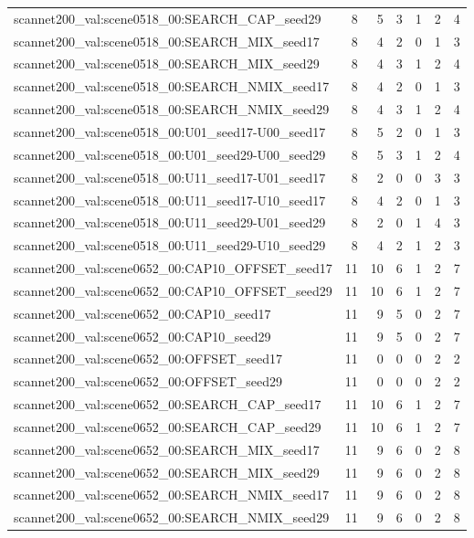 \begin{table}[t]
\begin{tabular}{lrrrrrr}
scannet200\_val:scene0518\_00:SEARCH\_CAP\_seed29 & 8 & 5 & 3 & 1 & 2 & 4 \\
scannet200\_val:scene0518\_00:SEARCH\_MIX\_seed17 & 8 & 4 & 2 & 0 & 1 & 3 \\
scannet200\_val:scene0518\_00:SEARCH\_MIX\_seed29 & 8 & 4 & 3 & 1 & 2 & 4 \\
scannet200\_val:scene0518\_00:SEARCH\_NMIX\_seed17 & 8 & 4 & 2 & 0 & 1 & 3 \\
scannet200\_val:scene0518\_00:SEARCH\_NMIX\_seed29 & 8 & 4 & 3 & 1 & 2 & 4 \\
scannet200\_val:scene0518\_00:U01\_seed17-U00\_seed17 & 8 & 5 & 2 & 0 & 1 & 3 \\
scannet200\_val:scene0518\_00:U01\_seed29-U00\_seed29 & 8 & 5 & 3 & 1 & 2 & 4 \\
scannet200\_val:scene0518\_00:U11\_seed17-U01\_seed17 & 8 & 2 & 0 & 0 & 3 & 3 \\
scannet200\_val:scene0518\_00:U11\_seed17-U10\_seed17 & 8 & 4 & 2 & 0 & 1 & 3 \\
scannet200\_val:scene0518\_00:U11\_seed29-U01\_seed29 & 8 & 2 & 0 & 1 & 4 & 3 \\
scannet200\_val:scene0518\_00:U11\_seed29-U10\_seed29 & 8 & 4 & 2 & 1 & 2 & 3 \\
scannet200\_val:scene0652\_00:CAP10\_OFFSET\_seed17 & 11 & 10 & 6 & 1 & 2 & 7 \\
scannet200\_val:scene0652\_00:CAP10\_OFFSET\_seed29 & 11 & 10 & 6 & 1 & 2 & 7 \\
scannet200\_val:scene0652\_00:CAP10\_seed17 & 11 & 9 & 5 & 0 & 2 & 7 \\
scannet200\_val:scene0652\_00:CAP10\_seed29 & 11 & 9 & 5 & 0 & 2 & 7 \\
scannet200\_val:scene0652\_00:OFFSET\_seed17 & 11 & 0 & 0 & 0 & 2 & 2 \\
scannet200\_val:scene0652\_00:OFFSET\_seed29 & 11 & 0 & 0 & 0 & 2 & 2 \\
scannet200\_val:scene0652\_00:SEARCH\_CAP\_seed17 & 11 & 10 & 6 & 1 & 2 & 7 \\
scannet200\_val:scene0652\_00:SEARCH\_CAP\_seed29 & 11 & 10 & 6 & 1 & 2 & 7 \\
scannet200\_val:scene0652\_00:SEARCH\_MIX\_seed17 & 11 & 9 & 6 & 0 & 2 & 8 \\
scannet200\_val:scene0652\_00:SEARCH\_MIX\_seed29 & 11 & 9 & 6 & 0 & 2 & 8 \\
scannet200\_val:scene0652\_00:SEARCH\_NMIX\_seed17 & 11 & 9 & 6 & 0 & 2 & 8 \\
scannet200\_val:scene0652\_00:SEARCH\_NMIX\_seed29 & 11 & 9 & 6 & 0 & 2 & 8 \\

\end{tabular}
\end{table}
